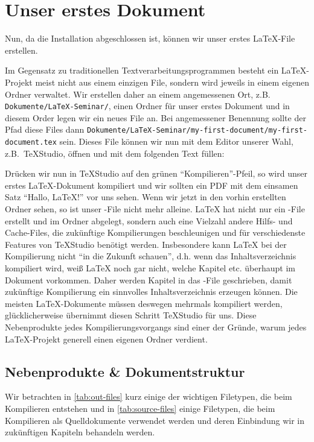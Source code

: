 \chapter{Unser erstes Dokument}
Nun, da die Installation abgeschlossen ist, können wir unser erstes \LaTeX{}-File erstellen.

Im Gegensatz zu traditionellen Textverarbeitungsprogrammen besteht ein \LaTeX{}-Projekt meist nicht aus einem einzigen File, sondern wird jeweils in einem eigenen Ordner verwaltet.
Wir erstellen daher an einem angemessenen Ort, z.B. \texttt{Dokumente/LaTeX-Seminar/}, einen Ordner für unser erstes Dokument und in diesem Order legen wir ein neues File an.
Bei angemessener Benennung sollte der Pfad diese Files dann \texttt{Dokumente/LaTeX-Seminar/my-first-document/my-first-document.tex} sein.
Dieses File können wir nun mit dem Editor unserer Wahl, z.B.~TeXStudio, öffnen und mit dem folgenden Text füllen:
Drücken wir nun in TeXStudio auf den grünen \enquote{Kompilieren}-Pfeil, so wird unser erstes LaTeX-Dokument kompiliert und wir sollten ein PDF mit dem einsamen Satz \enquote{Hallo, LaTeX!} vor uns sehen.
Wenn wir jetzt in den vorhin erstellten Ordner sehen, so ist unser -File nicht mehr alleine.
\LaTeX{} hat nicht nur ein -File erstellt und im Ordner abgelegt, sondern auch eine Vielzahl andere Hilfs- und Cache-Files, die zukünftige Kompilierungen beschleunigen und für verschiedenste Features von TeXStudio benötigt werden.
Insbesondere kann \LaTeX{} bei der Kompilierung nicht \enquote{in die Zukunft schauen}, d.h. wenn das Inhaltsverzeichnis kompiliert wird, weiß \LaTeX{} noch gar nicht, welche Kapitel etc. überhaupt im Dokument vorkommen.
Daher werden Kapitel in das -File geschrieben, damit zukünftige Kompilierung ein sinnvolles Inhaltsverzeichnis erzeugen können.
Die meisten \LaTeX{}-Dokumente müssen deswegen mehrmals kompiliert werden, glücklicherweise übernimmt diesen Schritt TeXStudio für uns.
Diese Nebenprodukte jedes Kompilierungsvorgangs sind einer der Gründe, warum jedes \LaTeX{}-Projekt generell einen eigenen Ordner verdient.

\section{Nebenprodukte \& Dokumentstruktur}
Wir betrachten in \autoref{tab:out-files} kurz einige der wichtigen Filetypen, die beim Kompilieren entstehen und in \autoref{tab:source-files} einige Filetypen, die beim Kompilieren als Quelldokumente verwendet werden und deren Einbindung wir in zukünftigen Kapiteln behandeln werden.

